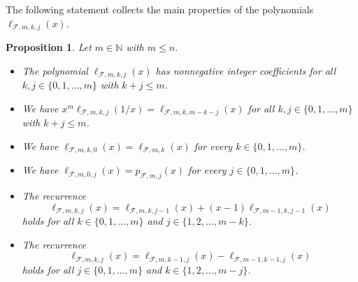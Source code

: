 \documentclass[11pt]{amsart}
\newtheorem{proposition}[theorem]{Proposition}
\newcommand{\fF}{{\mathcal F}}
\newcommand{\NN}{{\mathbb N}}
\begin{document}
The following statement collects the main properties 
of the polynomials $\ell_{\fF,m,k,j}(x)$.
%
\begin{proposition} \label{prop:lnkj} 
Let $m \in \NN$ with $m \le n$.
%
\begin{itemize}
\itemsep=0pt
\item[(a)] 
The polynomial $\ell_{\fF,m,k,j}(x)$ has 
nonnegative integer coefficients for all $k, j 
\in \{0, 1,\dots,m\}$ with $k + j \le m$.

\item[(b)] 
We have $x^m \ell_{\fF,m,k,j}(1/x) = 
\ell_{\fF,m,k,m-k-j}(x)$ for all $k, j \in 
\{0, 1,\dots,m\}$ with $k + j \le m$.

\item[(c)] 
We have $\ell_{\fF,m,k,0}(x) = \ell_{\fF,m,k}(x)$ 
for every $k \in \{0, 1,\dots,m\}$. 

\item[(d)] 
We have $\ell_{\fF,m,0,j}(x) = p_{\fF,m,j}(x)$ 
for every $j \in \{0, 1,\dots,m\}$.

\item[(e)] 
The recurrence 
%
\begin{equation*} %
\ell_{\fF,m,k,j}(x) = \ell_{\fF,m,k,j-1}(x) + (x-1) 
\ell_{\fF,m-1,k,j-1}(x)
\end{equation*}
%
holds for all $k \in \{0, 1,\dots,m\}$ and $j \in 
\{1, 2,\dots,m-k\}$.

\item[(f)] 
The recurrence 
%
\begin{equation*} %
\ell_{\fF,m,k,j}(x) = \ell_{\fF,m,k-1,j}(x) -
\ell_{\fF,m-1,k-1,j}(x)
\end{equation*}
% 
holds for all $j \in \{0, 1,\dots,m\}$ and $k \in 
\{1, 2,\dots,m-j\}$.

\end{itemize}
\end{proposition}
\end{document}
